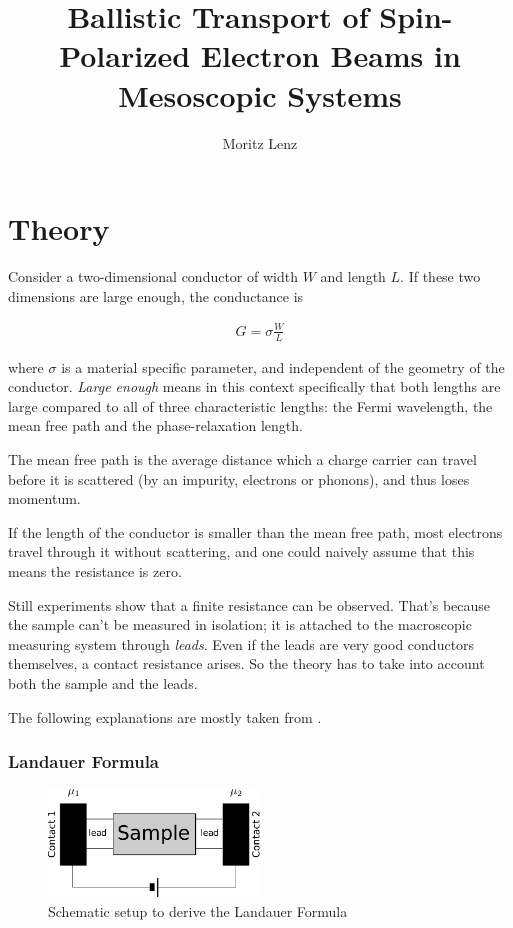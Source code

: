 \documentclass[11pt]{report}
\author{Moritz Lenz}
\title{Ballistic Transport of Spin-Polarized Electron Beams in Mesoscopic
Systems}
\begin{document}
\maketitle



\chapter{Theory}

Consider a two-dimensional conductor of width $W$ and length $L$. If these two
dimensions  are large enough, the conductance is

\begin{align}
    G = \sigma \frac{W}{L}
\end{align}

where $\sigma$ is a material specific parameter, and independent of the
geometry of the conductor. \emph{Large enough} means in this context
specifically that both lengths are large compared to all of three
characteristic lengths: the Fermi wavelength, the mean free path and the
phase-relaxation length.

The mean free path is the average distance which a charge carrier can travel
before it is scattered (by an impurity, electrons or phonons), and thus loses
momentum.

If the length of the conductor is smaller than the mean free path, most
electrons travel through it without scattering, and one could naively assume
that this means the resistance is zero.

Still experiments show that a finite resistance can be observed. That's
because the sample can't be measured in isolation; it is attached to the
macroscopic measuring system through \emph{leads}. Even if the leads are very
good conductors themselves, a contact resistance arises. So the theory has to
take into account both the sample and the leads.

The following explanations are mostly taken from \cite{datta}.

\subsection*{Landauer Formula}

\begin{figure}
    \begin{center}
        \includegraphics[width=0.5\textwidth]{sample-leads}
    \end{center}
    \caption{Schematic setup to derive the Landauer Formula}
    \label{fig:sample-leads}
\end{figure}
\end{document}

